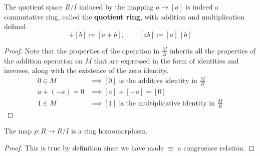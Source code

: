   \begin{definition}
    \label{def:quotient-rings-rings-of-residue-class}
    The quotient space $R/I$ induced by the mapping $a \mapsto [a]$ is indeed a commutative ring, called the \textbf{quotient ring}, with addition and multiplication defined 
    \begin{equation}
      [a] + [b] \coloneqq [a + b], \qquad [ab] \coloneqq [a] \, [b]
    \end{equation}
  \end{definition}
  \begin{proof}
    Note that the properties of the operation in $\frac{M}{R}$ inherits all the properties of the addition operation on $M$ that are expressed in the form of identities and inverses, along with the existence of the zero identity. 
    \begin{align*}
      0 \in M & \implies [0] \text{ is the additive identity in } \frac{M}{R} \\
      a + (-a) = 0 & \implies [a] + [-a] = [0] \\
      1 \in M & \implies [1] \text{ is the multiplicative identity in } \frac{M}{R}
    \end{align*}
  \end{proof} 

  \begin{theorem}
    \label{thm:quotient-maps-are-homomorphisms-2}
    The map $p: R \to R/I$ is a ring homomorphism. 
  \end{theorem}
  \begin{proof}
    This is true by definition since we have made $\equiv$ a congruence relation. 
  \end{proof}

